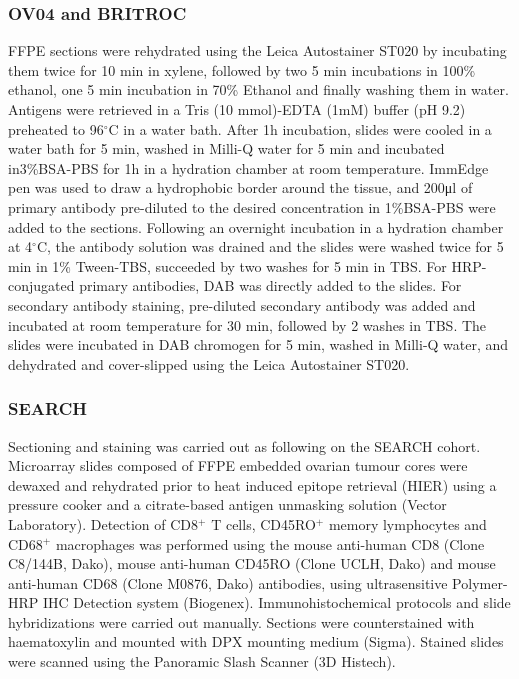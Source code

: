 \subsubsection{OV04 and BRITROC}\label{sec:sarwah_staining}
FFPE sections were rehydrated using the Leica Autostainer ST020 by incubating them twice for 10 min in xylene, followed by two 5 min incubations in 100\% ethanol, one 5 min incubation in 70\% Ethanol and finally washing them in water. Antigens were retrieved in a Tris (10 mmol)-EDTA (1mM) buffer (pH 9.2) preheated to 96${^\circ}$C in a water bath. After 1h incubation, slides were cooled in a water bath for 5 min, washed in Milli-Q water for 5 min and incubated in3\%BSA-PBS for 1h in a hydration chamber at room temperature. ImmEdge pen was used to draw a hydrophobic border around the tissue, and 200μl of primary antibody pre-diluted to the desired concentration in 1\%BSA-PBS were added to the sections. Following an overnight incubation in a hydration chamber at 4$^{\circ}$C, the antibody solution was drained and the slides were washed twice for 5 min in 1\% Tween-TBS, succeeded by two washes for 5 min in TBS. For HRP-conjugated primary antibodies, DAB was directly added to the slides. For secondary antibody staining, pre-diluted secondary antibody was added and incubated at room temperature for 30 min, followed by 2 washes in TBS. The slides were incubated in DAB chromogen for
5 min, washed in Milli-Q water, and dehydrated and cover-slipped using the Leica Autostainer ST020.

\subsubsection{SEARCH}
Sectioning and staining was carried out as following on the SEARCH cohort. Microarray slides composed of FFPE embedded ovarian tumour cores were dewaxed and rehydrated prior to heat induced epitope retrieval (HIER) using a pressure cooker and a citrate-based antigen unmasking solution (Vector Laboratory). Detection of CD8$^+$ T cells, CD45RO$^+$ memory lymphocytes and CD68$^+$ macrophages was performed using the mouse anti-human CD8 (Clone C8/144B, Dako), mouse anti-human CD45RO (Clone UCLH, Dako) and mouse anti-human CD68 (Clone M0876, Dako) antibodies, using ultrasensitive Polymer-HRP IHC Detection system (Biogenex). Immunohistochemical protocols and slide hybridizations were carried out manually. Sections were counterstained with haematoxylin and mounted with DPX mounting medium (Sigma). Stained slides were scanned using the Panoramic Slash Scanner (3D Histech).

